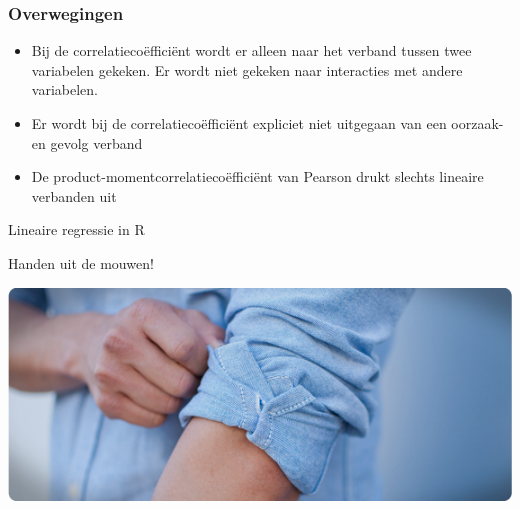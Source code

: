 \begin{frame}
	\frametitle{Overwegingen}
	\begin{itemize}
		\item Bij de correlatiecoëfficiënt wordt er alleen naar het verband tussen twee variabelen gekeken. Er wordt niet gekeken naar interacties met andere variabelen.
		\item Er wordt bij de correlatiecoëfficiënt expliciet niet uitgegaan van een oorzaak-en gevolg verband
		\item De product-momentcorrelatiecoëfficiënt van Pearson drukt slechts lineaire verbanden uit
	\end{itemize}
\end{frame}

\begin{frame}{Lineaire regressie in R}
	\begin{center}
		Handen uit de mouwen! 
	\end{center}
	\includegraphics[width=\textwidth]{img/handen.png}
\end{frame}







